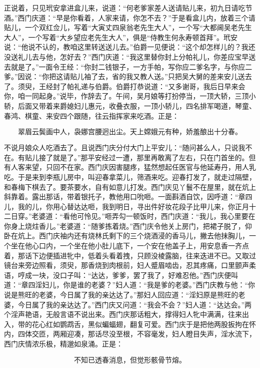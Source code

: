 正说着，只见玳安拿进盒儿来，说道：“何老爹家差人送请贴儿来，初九日请吃节酒。”西门庆道：“早是你看着，人家来请，你怎不去？”于是看盒儿内，放着三个请贴儿，一个双红佥儿，写着“大寅丈四泉翁老先生大人”，一个写“大都阃吴老先生大人”，一个写着“大乡望应老先生大人”，俱是“侍教生何永寿顿首拜”。玳安说：“他说不认的，教咱这里转送送儿去。”伯爵一见便说：“这个却怎样儿的？我还没送礼儿去与他，怎好去？”西门庆道：“我这里替你封上分帕礼儿，你差应宝早送去就是了。”一面令王经：“你封二钱银子，一方手帕，写你应二爹名字，与你应二爹。”因说：“你把这请贴儿袖了去，省的我又教人送。”只把吴大舅的差来安儿送去了。须臾，王经封了帕礼递与伯爵。伯爵打恭说道：“又多谢哥，我后日早来会你，咱一同起身。”说毕，作辞去了。午间，吴月娘等打扮停当，一顶大轿，三顶小轿，后面又带着来爵媳妇儿惠元，收叠衣服，一顶小轿儿，四名排军喝道，琴童、春鸿、棋童、来安四个跟随，往云指挥家来吃酒。正是：

\[
翠眉云鬓画中人，袅娜宫腰迥出尘。
天上嫦娥元有种，娇羞酿出十分春。
\]

不说月娘众人吃酒去了。且说西门庆分付大门上平安儿：“随问甚么人，只说我不在。有贴儿接了就是了。”那平安经过一遭，那里再敢离了左右，只在门首坐的。但有人客来望，只回不在家。西门庆因害腿疼，猛然想起任医官与他延寿丹，用人乳吃。于是来到李瓶儿房中，叫迎春拿菜儿，筛酒来吃。迎春打发了，就走过隔壁，和春梅下棋去了。要茶要水，自有如意儿打发。西门庆见丫鬟不在屋里，就在炕上斜靠着。露出那话，带着银托子，教他用口吮咂。一面斟酒自饮，因呼道：“章四儿，我的儿，你用心替达达咂，我到明日，寻出件好妆花段子比甲儿来，你正月十二日穿。”老婆道：“看他可怜见。”咂弄勾一顿饭时，西门庆道：“我儿，我心里要在你身上烧炷香儿。”老婆道：“随爹拣着烧。”西门庆令他关上房门，把裙子脱了，仰卧在炕上。西门庆袖内还有烧林氏剩下的三个烧酒浸的香马儿，撇去他抹胸儿，一个坐在他心口内，一个坐在他小肚儿底下，一个安在他盖子上，用安息香一齐点着，那话下边便插进牝中，低着头看着拽，只顾没棱露脑，往来迭进不已。又取过镜台来旁边照看，须臾，那香烧到肉根前，妇人蹙眉啮齿，忍其疼痛，口里颤声柔语，哼成一块，没口子叫：“达达，爹爹，罢了我了，好难忍他。”西门庆便叫道：“章四淫妇儿，你是谁的老婆？”妇人道：“我是爹的老婆。”西门庆教与他：“你说是熊旺的老婆，今日属了我的亲达达了。”那妇人回应道：“淫妇原是熊旺的老婆，今日属了我的亲达达了。”西门庆又问道：“我会不会？”妇人道：“达达会。”两个淫声艳语，无般言语不说出来。西门庆那话粗大，撑得妇人牝中满满，往来出入，带的花心红如鹦鹉舌，黑似蝙蝠翅，翻复可爱。西门庆于是把他两股扳拘在怀内，四体交匝，两厢迎凑，那话尽没至根，不容毫发，妇人瞪目失声，淫水流下，西门庆情浓乐极，精邈如泉涌。正是：

\[
不知已透春消息，但觉形骸骨节熔。
\]

